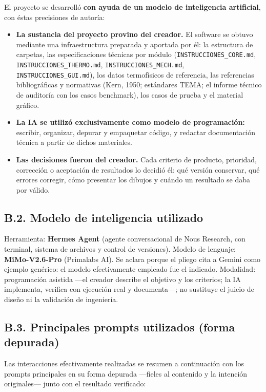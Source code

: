 \documentclass[11pt,a4paper]{article}
\begin{document}
El proyecto se desarroll\'o \textbf{con ayuda de un modelo de inteligencia
artificial}, con \'estas precisiones de autor\'ia:

\begin{itemize}
\item \textbf{La sustancia del proyecto provino del creador.} El software se
obtuvo mediante una infraestructura preparada y aportada por \'el: la
estructura de carpetas, las especificaciones t\'ecnicas por m\'odulo
(\texttt{INSTRUCCIONES\_CORE.md}, \texttt{INSTRUCCIONES\_THERMO.md},
\texttt{INSTRUCCIONES\_MECH.md}, \texttt{INSTRUCCIONES\_GUI.md}), los datos
termof\'isicos de referencia, las referencias bibliogr\'aficas y normativas
(Kern, 1950; est\'andares TEMA; el informe t\'ecnico de auditor\'ia con los
casos benchmark), los casos de prueba y el material gr\'afico.
\item \textbf{La IA se utiliz\'o exclusivamente como modelo de
programaci\'on:} escribir, organizar, depurar y empaquetar c\'odigo, y
redactar documentaci\'on t\'ecnica a partir de dichos materiales.
\item \textbf{Las decisiones fueron del creador.} Cada criterio de producto,
prioridad, correcci\'on o aceptaci\'on de resultados lo decidi\'o \'el:
qu\'e versi\'on conservar, qu\'e errores corregir, c\'omo presentar los
dibujos y cu\'ando un resultado se daba por v\'alido.
\end{itemize}

\subsection*{B.2. Modelo de inteligencia utilizado}

Herramienta: \textbf{Hermes Agent} (agente conversacional de Nous Research,
con terminal, sistema de archivos y control de versiones). Modelo de
lenguaje: \textbf{MiMo-V2.6-Pro} (Primalabs AI). Se aclara porque el pliego
cita a Gemini como ejemplo gen\'erico: el modelo efectivamente empleado fue
el indicado. Modalidad: programaci\'on asistida ---el creador describe el
objetivo y los criterios; la IA implementa, verifica con ejecuci\'on real y
documenta---; no sustituye el juicio de dise\~no ni la validaci\'on de
ingenier\'ia.

\subsection*{B.3. Principales prompts utilizados (forma depurada)}

Las interacciones efectivamente realizadas se resumen a continuaci\'on con
los prompts principales en su forma depurada ---fieles al contenido y la
intenci\'on originales--- junto con el resultado verificado:
\end{document}
